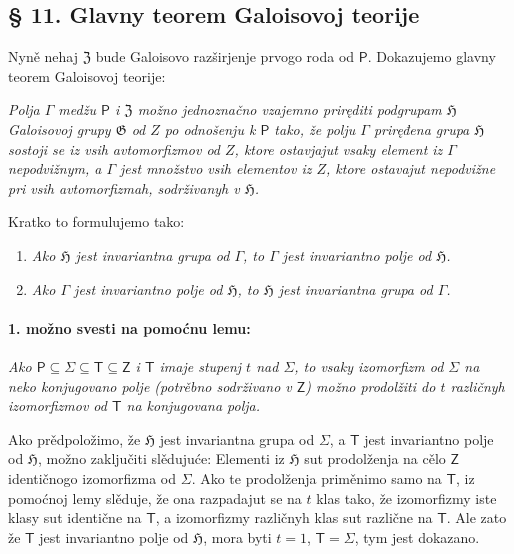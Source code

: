 \documentclass[11pt]{article}
\begin{document}
\subsection*{§ 11. Glavny teorem Galoisovoj teorije}\label{der-hauptsatz-der-galoisschen-theorie}

Nyně nehaj \(\mathfrak Z\) bude Galoisovo razširjenje prvogo roda od \(\mathsf P\). Dokazujemo glavny teorem Galoisovoj teorije:

\emph{Polja \(\Gamma\) medžu \(\mathsf P\) i \(\mathfrak Z\) možno jednoznačno vzajemno priręditi podgrupam \(\mathfrak H\) Galoisovoj grupy \(\mathfrak G\) od \(Z\) po odnošenju k \(\mathsf P\) tako, že polju \(\Gamma\) priręđena grupa \(\mathfrak H\) sostoji se iz vsih avtomorfizmov od \(Z\), ktore ostavjajut vsaky element iz \(\Gamma\) nepodvižnym, a \(\Gamma\) jest množstvo vsih elementov iz \(Z\), ktore ostavajut nepodvižne pri vsih avtomorfizmah, sodrživanyh v \(\mathfrak H\).}

Kratko to formulujemo tako:

\begin{enumerate}
\item \emph{Ako \(\mathfrak H\) jest invariantna grupa od \(\Gamma\), to \(\Gamma\) jest invariantno polje od \(\mathfrak H\).}
\item \emph{Ako \(\Gamma\) jest invariantno polje od \(\mathfrak H\), to \(\mathfrak H\) jest invariantna grupa od \(\Gamma\).}
\end{enumerate}

\paragraph{1. možno svesti na pomoćnu lemu:}\label{laesst-sich-zurueckfuehren-auf-den-hilfssatz}

\emph{Ako \(\mathsf P \subseteq \Sigma \subseteq \mathsf T \subseteq \mathsf Z\) i \(\mathsf T\) imaje stupenj \(t\) nad \(\Sigma\), to vsaky izomorfizm od \(\Sigma\) na neko konjugovano polje (potrěbno sodrživano v \(\mathsf Z\)) možno prodolžiti do \(t\) različnyh izomorfizmov od \(\mathsf T\) na konjugovana polja.}

Ako prědpoložimo, že \(\mathfrak H\) jest invariantna grupa od \(\Sigma\), a \(\mathsf T\) jest invariantno polje od \(\mathfrak H\), možno zaključiti slědujuće: Elementi iz \(\mathfrak H\) sut prodolženja na cělo \(\mathsf Z\) identičnogo izomorfizma od \(\Sigma\). Ako te prodolženja priměnimo samo na \(\mathsf T\), iz pomoćnoj lemy slěduje, že ona razpadajut se na \(t\) klas tako, že izomorfizmy iste klasy sut identične na \(\mathsf T\), a izomorfizmy različnyh klas sut različne na \(\mathsf T\). Ale zato že \(\mathsf T\) jest invariantno polje od \(\mathfrak H\), mora byti \(t=1\), \(\mathsf T=\Sigma\), tym jest dokazano.
\end{document}
